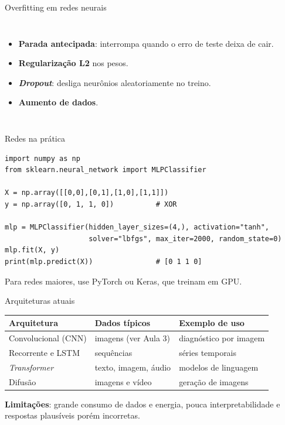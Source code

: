 \documentclass[10pt]{beamer}
\begin{document}
\begin{frame}{Overfitting em redes neurais}
\begin{columns}[c]
\begin{itemize}
 \item \textbf{Parada antecipada}: interrompa quando o erro de teste deixa de cair.
 \item \textbf{Regularização L2} nos pesos.
 \item \textbf{\textit{Dropout}}: desliga neurônios aleatoriamente no treino.
 \item \textbf{Aumento de dados}.
\end{itemize}
\end{columns}
\end{frame}

\begin{frame}[fragile]{Redes na prática}
\begin{lstlisting}
import numpy as np
from sklearn.neural_network import MLPClassifier

X = np.array([[0,0],[0,1],[1,0],[1,1]])
y = np.array([0, 1, 1, 0])          # XOR

mlp = MLPClassifier(hidden_layer_sizes=(4,), activation="tanh",
                    solver="lbfgs", max_iter=2000, random_state=0)
mlp.fit(X, y)
print(mlp.predict(X))               # [0 1 1 0]
\end{lstlisting}
\small Para redes maiores, use PyTorch ou Keras, que treinam em GPU.
\end{frame}

\begin{frame}{Arquiteturas atuais}
\small
\begin{tabularx}{\textwidth}{@{}l X X@{}}
\toprule
\textbf{Arquitetura} & \textbf{Dados típicos} & \textbf{Exemplo de uso} \\
\midrule
Convolucional (CNN) & imagens (ver Aula 3) & diagnóstico por imagem \\
Recorrente e LSTM & sequências & séries temporais \\
\textit{Transformer} & texto, imagem, áudio & modelos de linguagem \\
Difusão & imagens e vídeo & geração de imagens \\
\bottomrule
\end{tabularx}

\vspace{2mm}
\textbf{Limitações}: grande consumo de dados e energia, pouca interpretabilidade e respostas plausíveis porém incorretas.
\end{frame}
\end{document}
